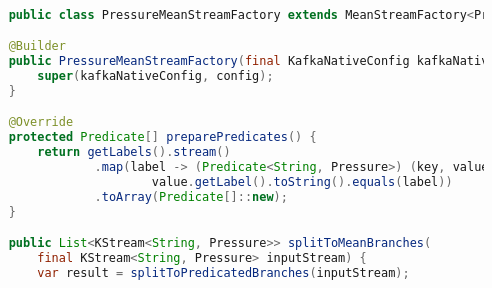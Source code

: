 \begin{lstlisting}[caption=Poprzednia implementacja przetwarzająca strumienie danych, label={lst:pressure_mean_stream_factory},language=Java]

    public class PressureMeanStreamFactory extends MeanStreamFactory<Pressure, PressureAggregation> {

    @Builder
    public PressureMeanStreamFactory(final KafkaNativeConfig kafkaNativeConfig, final MeanStreamConfig config) {
        super(kafkaNativeConfig, config);
    }

    @Override
    protected Predicate[] preparePredicates() {
        return getLabels().stream()
                .map(label -> (Predicate<String, Pressure>) (key, value) -> 
                        value.getLabel().toString().equals(label))
                .toArray(Predicate[]::new);
    }

    public List<KStream<String, Pressure>> splitToMeanBranches(
        final KStream<String, Pressure> inputStream) {
        var result = splitToPredicatedBranches(inputStream);


\end{lstlisting}
